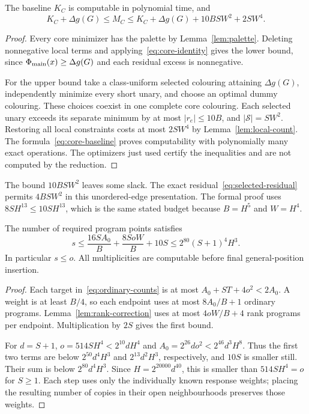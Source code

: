 \begin{proposition}\label{prop:core-encoding}
The baseline $K_C$ is computable in polynomial time, and
\begin{equation}\label{eq:core-bound}
K_C+\Delta g(G)\leq M_C\leq
K_C+\Delta g(G)+10BSW^2+2SW^4.
\end{equation}
\end{proposition}
\begin{proof}
Every core minimizer has the palette by Lemma~\ref{lem:palette}. Deleting nonnegative local terms and applying~\eqref{eq:core-identity} gives the lower bound, since $\Phi_{\rm main}(x)\geq\Delta g(G)$ and each residual excess is nonnegative.

For the upper bound take a class-uniform selected colouring attaining $\Delta g(G)$, independently minimize every short unary, and choose an optimal dummy colouring. These choices coexist in one complete core colouring. Each selected unary exceeds its separate minimum by at most $|r_e|\leq10B$, and $|\mathcal S|=SW^2$. Restoring all local constraints costs at most $2SW^4$ by Lemma~\ref{lem:local-count}. The formula~\eqref{eq:core-baseline} proves computability with polynomially many exact operations. The optimizers just used certify the inequalities and are not computed by the reduction.
\end{proof}

The bound $10BSW^2$ leaves some slack. The exact residual~\eqref{eq:selected-residual} permits $4BSW^2$ in this unordered-edge presentation. The formal proof uses $8SH^{13}\leq10SH^{13}$, which is the same stated budget because $B=H^5$ and $W=H^4$.

\begin{proposition}\label{prop:program-count}
The number of required program points satisfies
\begin{equation}\label{eq:program-count}
s\leq\frac{16SA_0}{B}+\frac{8SoW}{B}+10S
\leq2^{80}(S+1)^4H^3.
\end{equation}
In particular $s\leq o$. All multiplicities are computable before final general-position insertion.
\end{proposition}
\begin{proof}
Each target in~\eqref{eq:ordinary-counts} is at most $A_0+ST+4o^2<2A_0$. A weight is at least $B/4$, so each endpoint uses at most $8A_0/B+1$ ordinary programs. Lemma~\ref{lem:rank-correction} uses at most $4oW/B+4$ rank programs per endpoint. Multiplication by $2S$ gives the first bound.

For $d=S+1$, $o=514SH^4<2^{10}dH^4$ and
$A_0=2^{26}do^2<2^{46}d^3H^8$.
Thus the first two terms are below $2^{50}d^4H^3$ and $2^{13}d^2H^3$, respectively, and $10S$ is smaller still. Their sum is below $2^{80}d^4H^3$. Since $H=2^{20000}d^{40}$, this is smaller than $514SH^4=o$ for $S\geq1$. Each step uses only the individually known response weights; placing the resulting number of copies in their open neighbourhoods preserves those weights.
\end{proof}
